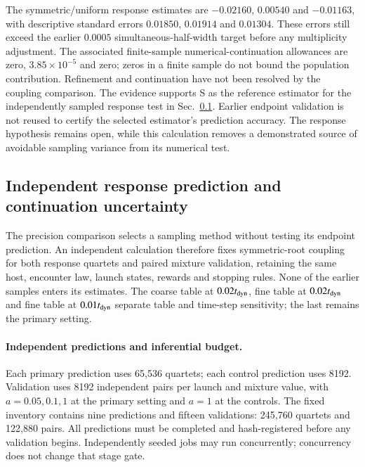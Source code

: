 \documentclass[aps,prd,reprint,amsmath,amssymb,superscriptaddress,nofootinbib,longbibliography,floatfix]{revtex4-2}
\begin{document}
The symmetric/uniform response estimates are $-0.02160$, $0.00540$ and $-0.01163$, with descriptive standard errors $0.01850$, $0.01914$ and $0.01304$. These errors still exceed the earlier $0.0005$ simultaneous-half-width target before any multiplicity adjustment. The associated finite-sample numerical-continuation allowances are zero, $3.85\times10^{-5}$ and zero; zeros in a finite sample do not bound the population contribution. Refinement and continuation have not been resolved by the coupling comparison. The evidence supports S as the reference estimator for the independently sampled response test in Sec.~\ref{sec:independent-response}. Earlier endpoint validation is not reused to certify the selected estimator's prediction accuracy. The response hypothesis remains open, while this calculation removes a demonstrated source of avoidable sampling variance from its numerical test.

\subsection{Independent response prediction and continuation uncertainty}\label{sec:independent-response}

The precision comparison selects a sampling method without testing its endpoint prediction. An independent calculation therefore fixes symmetric-root coupling for both response quartets and paired mixture validation, retaining the same host, encounter law, launch states, rewards and stopping rules. None of the earlier samples enters its estimates. The coarse table at $0.02t_{\rm dyn}$, fine table at $0.02t_{\rm dyn}$ and fine table at $0.01t_{\rm dyn}$ separate table and time-step sensitivity; the last remains the primary setting.

\paragraph{Independent predictions and inferential budget.}
Each primary prediction uses 65,536 quartets; each control prediction uses 8192. Validation uses 8192 independent pairs per launch and mixture value, with $a=0.05,0.1,1$ at the primary setting and $a=1$ at the controls. The fixed inventory contains nine predictions and fifteen validations: 245,760 quartets and 122,880 pairs. All predictions must be completed and hash-registered before any validation begins. Independently seeded jobs may run concurrently; concurrency does not change that stage gate.
\end{document}
